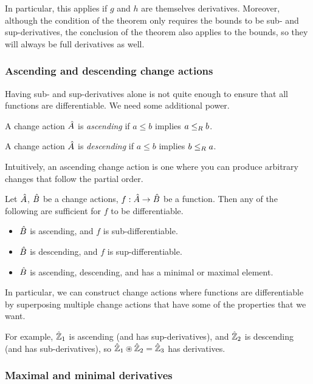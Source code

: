 In particular, this applies if $g$ and $h$ are themselves derivatives. Moreover,
although the condition of the theorem only requires the bounds to be sub- and
sup-derivatives, the conclusion of the theorem also applies to the bounds, so
they will always be full derivatives as well.

\subsubsection{Ascending and descending change actions}

Having sub- and sup-derivatives alone is not quite enough to ensure that all
functions are differentiable. We need some additional power.

\begin{defn}
  A change action $\hat{A}$ is \textit{ascending} if $a \leq b$ implies $a
  \leq_R b$.

  A change action $\hat{A}$ is \textit{descending} if $a \leq b$ implies $b
  \leq_R a$.
\end{defn}

Intuitively, an ascending change action is one where you can produce
arbitrary changes that follow the partial order.

\begin{thm}
  Let $\hat{A}$, $\hat{B}$ be a change actions, $f: \hat{A} \rightarrow \hat{B}$ be a function. Then
  any of the following are sufficient for $f$ to be differentiable.
  \begin{itemize}
    \item $\hat{B}$ is ascending, and $f$ is sub-differentiable.
    \item $\hat{B}$ is descending, and $f$ is sup-differentiable.
    \item $\hat{B}$ is ascending, descending, and has a minimal or maximal element.
  \end{itemize}
\end{thm}

In particular, we can construct change actions where functions are
differentiable by superposing multiple change actions that have some of the
properties that we want.

For example, $\hat{\mathbb{Z}}_1$ is ascending (and has sup-derivatives), and
$\hat{\mathbb{Z}}_2$ is descending (and has sub-derivatives), so $\hat{\mathbb{Z}}_1
\circledast \hat{\mathbb{Z}}_2 = \hat{\mathbb{Z}}_3$ has derivatives.

\subsubsection{Maximal and minimal derivatives}

